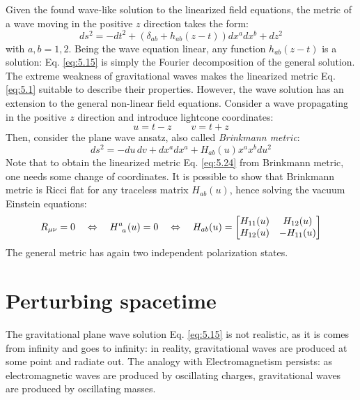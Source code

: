 Given the found wave-like solution to the linearized field equations, the metric of a wave moving in the positive $ z $ direction takes the form:
\begin{equation}
  ds^2 = -dt^2 + \left( \delta_{ab} + h_{ab}(z - t) \right) dx^a dx^b + dz^2
  \label{eq:5.24}
\end{equation}
with $ a,b = 1,2 $. Being the wave equation linear, any function $ h_{ab}(z - t) $ is a solution: Eq. \ref{eq:5.15} is simply the Fourier decomposition of the general solution.\\
The extreme weakness of gravitational waves makes the linearized metric Eq. \ref{eq:5.1} suitable to describe their properties. However, the wave solution has an extension to the general non-linear field equations. Consider a wave propagating in the positive $ z $ direction and introduce lightcone coordinates:
\begin{equation*}
  u = t - z
  \qquad
  v = t + z
\end{equation*}
Then, consider the plane wave ansatz, also called \textit{Brinkmann metric}:
\begin{equation*}
  ds^2 = -du\,dv + dx^a dx^a + H_{ab}(u) x^a x^b du^2
\end{equation*}
Note that to obtain the linearized metric Eq. \ref{eq:5.24} from Brinkmann metric, one needs some change of coordinates. It is possible to show that Brinkmann metric is Ricci flat for any traceless matrix $ H_{ab}(u) $, hence solving the vacuum Einstein equations:
\begin{equation*}
  R_{\mu \nu} = 0 \quad \Leftrightarrow \quad \tensor{H}{^a_a}(u) = 0 \quad \Leftrightarrow \quad H_{ab}(u) =
  \begin{bmatrix}
    H_{11}(u) & H_{12}(u) \\
    H_{12}(u) & -H_{11}(u)
  \end{bmatrix}
\end{equation*}
The general metric has again two independent polarization states.

\section{Perturbing spacetime}

The gravitational plane wave solution Eq. \ref{eq:5.15} is not realistic, as it is comes from infinity and goes to infinity: in reality, gravitational waves are produced at some point and radiate out. The analogy with Electromagnetism persists: as electromagnetic waves are produced by oscillating charges, gravitational waves are produced by oscillating masses.

